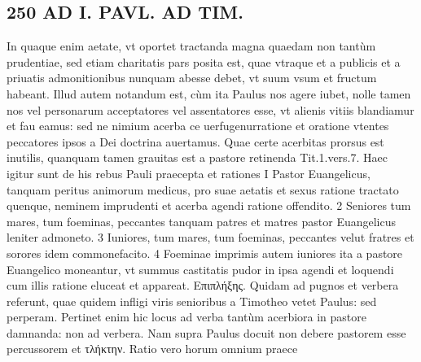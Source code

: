 \documentclass{article}
\begin{document}
\begin{pages}
\section*{250 AD I. PAVL. AD TIM. }\pstart In quaque enim aetate, vt oportet tractanda magna quaedam non tantùm prudentiae, sed etiam charitatis pars posita est, quae vtraque et a publicis et a priuatis admonitionibus nunquam abesse debet, vt suum vsum et fructum habeant.  \pend\pstart Illud autem notandum est, cùm ita Paulus nos agere iubet, nolle tamen nos vel personarum acceptatores vel assentatores esse, vt alienis vitiis blandiamur et fau eamus: sed ne nimium acerba ce uerfugenurratione et oratione vtentes peccatores ipsos a Dei doctrina auertamus. Quae certe acerbitas prorsus est inutilis, quanquam tamen grauitas est a pastore retinenda Tit.1.vers.7.  \pend\pstart Haec igitur sunt de his rebus Pauli praecepta et rationes I Pastor Euangelicus, tanquam peritus animorum medicus, pro suae aetatis et sexus ratione tractato quenque, neminem imprudenti et acerba agendi ratione offendito. 2 Seniores tum mares, tum foeminas, peccantes tanquam patres et matres pastor Euangelicus leniter admoneto. 3 Iuniores, tum mares, tum foeminas, peccantes velut fratres et sorores idem commonefacito. 4 Foeminae imprimis autem iuniores ita a pastore Euangelico moneantur, vt summus castitatis pudor in ipsa agendi et loquendi cum illis ratione eluceat et appareat.  \pend\pstart Επιπλήξης. Quidam ad pugnos et verbera referunt, quae quidem infligi viris senioribus a Timotheo vetet Paulus: sed perperam. Pertinet enim hic locus ad verba tantùm acerbiora in pastore damnanda: non ad verbera. Nam supra Paulus docuit non debere pastorem esse percussorem et τλήκτην. Ratio vero horum omnium praece\pend

\end{pages}
\end{document}
